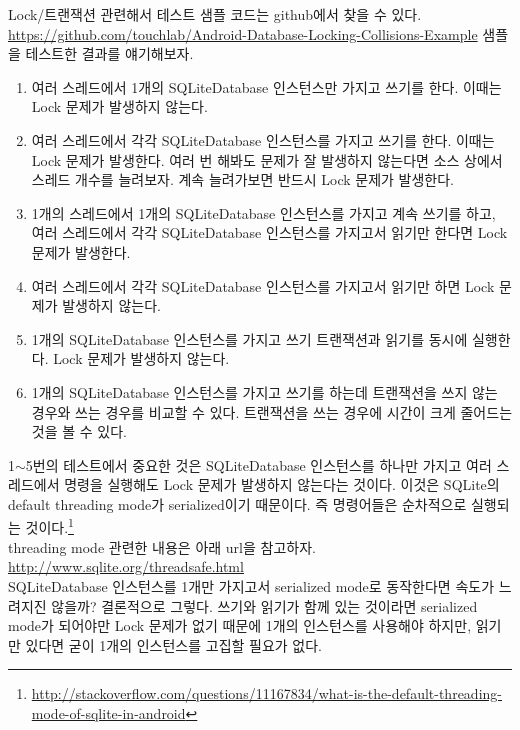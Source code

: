Lock/트랜잭션 관련해서 테스트 샘플 코드는 github에서 찾을 수 있다.
\url{https://github.com/touchlab/Android-Database-Locking-Collisions-Example}
샘플을 테스트한 결과를 얘기해보자.
\begin{enumerate}
\item 여러 스레드에서 1개의 SQLiteDatabase 인스턴스만 가지고 쓰기를 한다. 이때는 Lock 문제가 발생하지 않는다. 

\item 여러 스레드에서 각각 SQLiteDatabase 인스턴스를 가지고 쓰기를 한다. 이때는 Lock 문제가 발생한다. 여러 번 해봐도 문제가 잘 발생하지 않는다면 소스 상에서 스레드 개수를 늘려보자. 계속 늘려가보면 반드시 Lock 문제가 발생한다.

\item 1개의 스레드에서 1개의 SQLiteDatabase 인스턴스를 가지고 계속 쓰기를 하고, 여러 스레드에서 각각 SQLiteDatabase 인스턴스를 가지고서 읽기만 한다면 Lock 문제가 발생한다.

\item 여러 스레드에서 각각 SQLiteDatabase 인스턴스를 가지고서 읽기만 하면 Lock 문제가 발생하지 않는다.

\item 1개의 SQLiteDatabase 인스턴스를 가지고 쓰기 트랜잭션과 읽기를 동시에 실행한다. Lock 문제가 발생하지 않는다.

\item 1개의 SQLiteDatabase 인스턴스를 가지고 쓰기를 하는데 트랜잭션을 쓰지 않는 경우와 쓰는 경우를 비교할 수 있다. 트랜잭션을 쓰는 경우에 시간이 크게 줄어드는 것을 볼 수 있다.

\end{enumerate}

1$\sim$5번의 테스트에서 중요한 것은  SQLiteDatabase 인스턴스를 하나만 가지고 여러 스레드에서 명령을 실행해도 Lock 문제가 발생하지 않는다는 것이다. 이것은 SQLite의 default threading mode가 serialized이기 때문이다. 즉 명령어들은 순차적으로 실행되는 것이다.\footnote{\url{http://stackoverflow.com/questions/11167834/what-is-the-default-threading-mode-of-sqlite-in-android}}\\

threading mode 관련한 내용은 아래 url을 참고하자.\\
\url{http://www.sqlite.org/threadsafe.html}\\

SQLiteDatabase 인스턴스를 1개만 가지고서 serialized mode로 동작한다면 속도가 느려지진 않을까? 결론적으로 그렇다.
쓰기와 읽기가 함께 있는 것이라면 serialized mode가 되어야만 Lock 문제가 없기 때문에 1개의 인스턴스를 사용해야 하지만, 읽기만 있다면 굳이 1개의 인스턴스를 고집할 필요가 없다.

